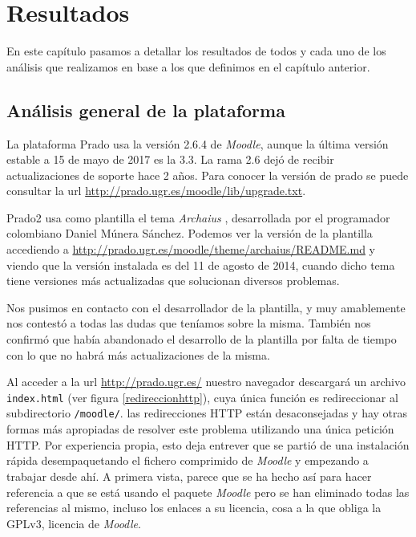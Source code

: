 \chapter{Resultados}

En este capítulo pasamos a detallar los resultados de todos y cada uno de los análisis que realizamos en base a los que definimos en el capítulo anterior.

\section{Análisis general de la plataforma}

La plataforma Prado usa la versión 2.6.4 de \textit{Moodle}, aunque la última versión estable a 15 de mayo de 2017 es la 3.3. La rama 2.6 dejó de recibir actualizaciones de soporte hace 2 años. Para conocer la versión de prado se puede consultar la url \url{http://prado.ugr.es/moodle/lib/upgrade.txt}.

\bigskip
Prado2 usa como plantilla el tema \textit{Archaius} \cite{moodletheme}, desarrollada por el programador colombiano Daniel Múnera Sánchez. Podemos ver la versión de la plantilla accediendo a \url{http://prado.ugr.es/moodle/theme/archaius/README.md} y viendo que la versión instalada es del 11 de agosto de 2014, cuando dicho tema tiene versiones más actualizadas que solucionan diversos problemas.

\bigskip
Nos pusimos en contacto con el desarrollador de la plantilla, y muy amablemente nos contestó a todas las dudas que teníamos sobre la misma. También nos confirmó que había abandonado el desarrollo de la plantilla por falta de tiempo con lo que no habrá más actualizaciones de la misma.

\bigskip
Al acceder a la url \url{http://prado.ugr.es/} nuestro navegador descargará un archivo \texttt{index.html} (ver figura \ref{redireccionhttp}), cuya única función es redireccionar al subdirectorio \texttt{/moodle/}. las redirecciones HTTP están desaconsejadas y hay otras formas más apropiadas de resolver este problema utilizando una única petición HTTP. Por experiencia propia, esto deja entrever que se partió de una instalación rápida desempaquetando el fichero comprimido de \textit{Moodle} y empezando a trabajar desde ahí. A primera vista, parece que se ha hecho así para hacer referencia a que se está usando el paquete \textit{Moodle} pero se han eliminado todas las referencias al mismo, incluso los enlaces a su licencia, cosa a la que obliga la GPLv3, licencia de \textit{Moodle}.

